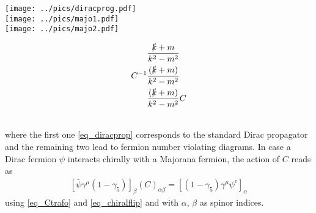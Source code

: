 \begin{minipage}{0.49\textwidth}
 \texttt{[image: ../pics/diracprog.pdf]}\\
 \texttt{[image: ../pics/majo1.pdf]}\\
 \texttt{[image: ../pics/majo2.pdf]}
\end{minipage}
\begin{minipage}{0.45\textwidth}
\begin{flushleft}
\begin{subequations}
\begin{align}
&\frac{\slashed{k}+m}{k^2-m^2}\label{eq_diracprop}\\
 C^{-1}&\frac{(\slashed{k}+m)}{k^2-m^2}\label{eq_majproptowards}\\
 &\frac{(\slashed{k}+m)}{k^2-m^2}C\label{eq_majpropoutwards}
\end{align}
\end{subequations}
\end{flushleft}
\end{minipage}
\\
\noindent where the first one \eqref{eq_diracprop} corresponds to the standard Dirac propagator and the remaining two lead to fermion number 
violating diagrams. In case a Dirac fermion $\psi$ interacts chirally with a Majorana fermion, the action of $C$ reads as \cite{Langacker}
\begin{align}
 \left[\bar\psi \gamma^\mu (1-\gamma_5)\right]_\beta (C)_{\alpha\beta} = \left[(1-\gamma_5)\gamma^\mu \psi^c\right]_\alpha
 \label{eq_DirMaj}
\end{align}
using \eqref{eq_Ctrafo} and \eqref{eq_chiralflip} and with $\alpha$, $\beta$ as spinor indices. 


